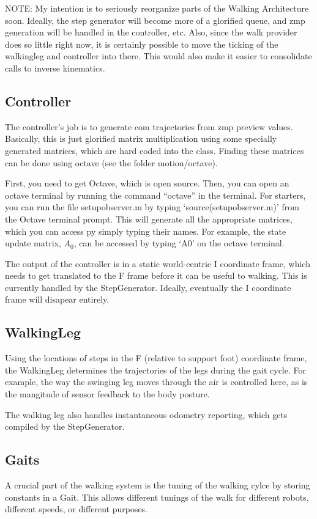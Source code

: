 \documentclass[11pt]{article}
\begin{document}
NOTE: My intention is to seriously reorganize parts of the Walking Architecture
soon.  Ideally, the step generator will become more of a glorified queue, and
zmp generation will be handled in the controller, etc. Also, since the walk
provider does so little right now, it is certainly possible to move the ticking
of the walkingleg and controller into there. This would also make it easier
to consolidate calls to inverse kinematics.

\subsection{Controller}
The controller's job is to generate com trajectories from zmp preview values.
Basically, this is just glorified matrix multiplication using some specially
generated matrices, which are hard coded into the class. Finding these
matrices can be done using octave (see the folder motion/octave).

First, you need to get Octave, which is open source. Then, you can open an
octave terminal by running the command ``octave'' in the terminal.
For starters, you can run the file setupobserver.m by typing
`source(setupobserver.m)' from the Octave terminal prompt.
This will generate all the appropriate
matrices, which you can access py simply typing their names. For example, the
state update matrix, $A_0$, can be accessed by typing `A0' on the octave
terminal.

The output of the controller is in a static world-centric I coordinate frame,
which needs to get translated to the F frame before it can be useful to walking.
This is currently handled by the StepGenerator. Ideally, eventually the I
coordinate frame will disapear entirely.

\subsection{WalkingLeg}
Using the locations of steps in the F (relative to support foot) coordinate
frame, the WalkingLeg determines the trajectories of the legs during the gait
cycle. For example, the way the swinging leg moves through the air is controlled
here, as is the mangitude of sensor feedback to the body posture.

The walking leg also handles instantaneous odometry reporting, which gets
compiled by the StepGenerator.

\subsection{Gaits}
A crucial part of the walking system is the tuning of the walking cylce by
storing constants in a Gait. This allows different tunings of the walk for
different robots, different speeds, or different purposes.
\end{document}

